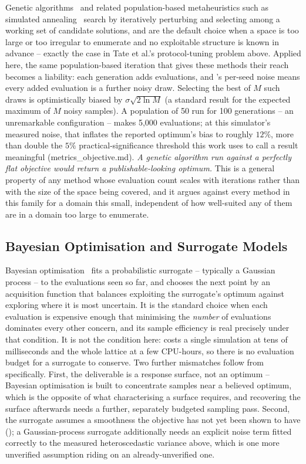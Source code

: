 Genetic algorithms~\cite{Gordon93serialand, WHITELY93} and related
population-based metaheuristics such as simulated
annealing~\cite{kirkpatrick83optimization} search by iteratively
perturbing and selecting among a working set of candidate solutions, and are
the default choice when a space is too large or too irregular to enumerate and
no exploitable structure is known in advance -- exactly the case in
Tate et al.'s protocol-tuning problem above. Applied here, the same
population-based iteration that gives these methods their reach becomes a
liability: each generation adds evaluations, and 's
per-seed noise means every added evaluation is a further noisy draw. Selecting
the best of $M$ such draws is optimistically biased by
$\sigma \sqrt{2 \ln M}$ (a standard result for the expected maximum of
$M$ noisy samples). A population of 50 run for 100 generations -- an
unremarkable configuration -- makes 5{,}000 evaluations; at this simulator's
measured noise, that inflates the reported optimum's bias to roughly
$12\%$, more than double the $5\%$ practical-significance threshold this work
uses to call a result meaningful (metrics\_objective.md). \emph{A genetic
algorithm run against a perfectly flat objective would return a
publishable-looking optimum.} This is a general property of any method whose
evaluation count scales with iterations rather than with the size of the space
being covered, and it argues against every method in this family for a
domain this small, independent of how well-suited any of them are in a
domain too large to enumerate.

\subsection{Bayesian Optimisation and Surrogate Models}

Bayesian optimisation~\cite{jones1998efficient, shahriari2016taking} fits a
probabilistic surrogate -- typically a Gaussian process -- to the evaluations
seen so far, and chooses the next point by an acquisition function that
balances exploiting the surrogate's optimum against exploring where it is most
uncertain. It is the standard choice when each evaluation is expensive enough
that minimising the \emph{number} of evaluations dominates every other
concern, and its sample efficiency is real precisely under that condition. It
is not the condition here:  costs a single simulation at
tens of milliseconds and the whole lattice at a few CPU-hours, so there is no
evaluation budget for a surrogate to conserve. Two further mismatches follow
from  specifically. First, the deliverable is a response
surface, not an optimum -- Bayesian optimisation is built to concentrate
samples near a believed optimum, which is the opposite of what characterising
a surface requires, and recovering the surface afterwards needs a further,
separately budgeted sampling pass. Second, the surrogate assumes a smoothness
the objective has not yet been shown to have (); a
Gaussian-process surrogate additionally needs an explicit noise term fitted
correctly to the measured heteroscedastic variance above, which is one more
unverified assumption riding on an already-unverified one.

